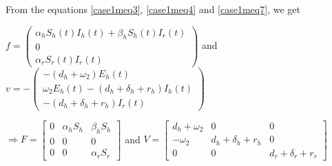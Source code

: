 From the equations \ref{case1meq3}, \ref{case1meq4} and \ref{case1meq7}, we get 

$f = \begin{pmatrix}
	\alpha_{h}S_{h}(t)I_{h}(t)+\beta_{h}S_{h}(t)I_{r}(t)\\
	0\\
	\alpha_{r}S_{r}(t)I_{r}(t)
	\end{pmatrix}$ and
$v = -\begin{pmatrix}
	-(d_{h}+\omega_{2})E_{h}(t)\\
	\omega_{2} E_{h}(t) -(d_{h} +\delta_{h} +r_{h})I_{h}(t)\\
	-(d_{h} +\delta_{h} +r_{h})I_{r}(t)
	\end{pmatrix}$
	
$\Rightarrow F = \begin{bmatrix}
				  0 & \alpha_{h}S_{h} & \beta_{h}S_{h}\\
				  0 & 0 & 0\\
				  0 & 0 & \alpha_{r}S_{r}
				  \end{bmatrix}$ and
			$V = \begin{bmatrix}
				  d_{h}+\omega_{2} & 0 & 0\\
				  -\omega_{2} & d_{h} +\delta_{h} +r_{h} & 0\\
				  0 & 0 & d_{r} +\delta_{r} +r_{r}
				  \end{bmatrix}$
				  
